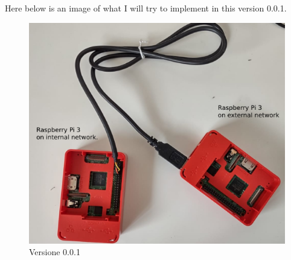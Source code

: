 \documentclass[a4paper,11pt]{scrartcl}
\begin{document}
Here below is an image of what I will try to implement in this version 0.0.1.
\begin{figure}[htbp]
\centerline{\includegraphics{0.0.1.png}}
\caption{Versione 0.0.1}
\label{fig}
\end{figure}





\end{document}
